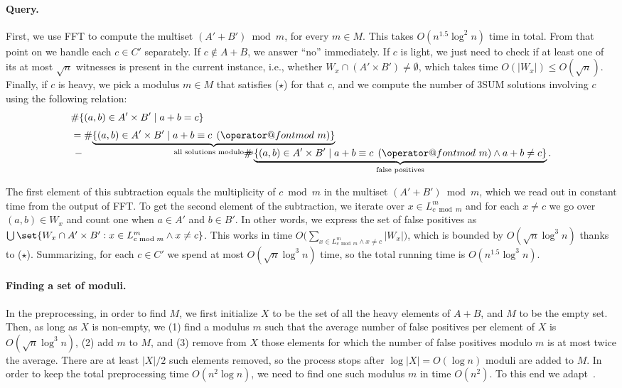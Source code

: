 \documentclass{theoretics}
\makeatletter
\newcommand{\tpmod}[1]{\mkern 8mu({\operator@font mod}\mkern 6mu#1)}
\makeatother
\begin{document}
\paragraph{Query.}
First, we use FFT to compute the multiset $(A'+B') \bmod m$, for every $m \in M$. This takes $O(n^{1.5} \log^2 n)$ time in total. From that point on we handle each $c \in C'$ separately. If $c \notin A+B$, we answer ``no'' immediately. If $c$ is light, we just need to check if at least one of its at most $\sqrt{n}$ witnesses is present in the current instance, i.e., whether $W_x \cap (A' \times B') \neq \emptyset$, which takes time $O(|W_x|) \leqslant O(\sqrt{n})$. Finally, if $c$ is heavy, we pick a modulus $m \in M$ that satisfies ($\star$) for that $c$, and we compute the number of 3SUM solutions involving $c$ using the following relation:
\begin{align*}
& \# \{(a,b) \in A' \times B' \mid a+b=c\} \\[.3em]
& = \# \smash{\underbrace{\{(a,b) \in A' \times B' \mid a + b \equiv c \tpmod{m}\}}_{\text{all solutions modulo $m$}}} \\[.3em]
&\, - \hspace{16em} \# \underbrace{\{(a,b) \in A' \times B' \mid a + b \equiv c \tpmod{m} \land a + b \neq c\}}_{\text{false positives}}.
\end{align*}

The first element of this subtraction equals the multiplicity of $c \bmod m$ in the multiset $(A'+B') \bmod m$, which we read out in constant time from the output of FFT. To get the second element of the subtraction, we iterate over $x \in L^m_{c \bmod m}$ and for each $x \neq c$ we go over $(a,b) \in W_x$ and count one when $a \in A'$ and $b \in B'$. In other words, we express the set of false positives as 
$\bigcup\set{W_x \cap A' \times B' : x \in L^m_{c \bmod m} \land x \neq c}$. This works in time $O\big(\sum_{x \in L^m_{c \bmod m} \land x \neq c} |W_x|\big)$, which is bounded by $O(\sqrt{n} \log^3 n)$ thanks to ($\star$). Summarizing, for each $c \in C'$ we spend at most $O(\sqrt{n} \log^3 n)$ time, so the total running time is $O(n^{1.5} \log^3 n)$.

\paragraph{Finding a set of moduli.}
In the preprocessing, in order to find $M$, we first initialize $X$ to be the set of all the heavy elements of $A+B$, and $M$ to be the empty set. Then, as long as $X$ is non-empty, we (1) find a modulus $m$ such that the average number of false positives per element of $X$ is $O(\sqrt{n} \log^3 n)$, (2) add $m$ to $M$, and (3) remove from $X$ those elements for which the number of false positives modulo $m$ is at most twice the average. There are at least $|X|/2$ such elements removed, so the process stops after $\log |X| = O(\log n)$ moduli are added to $M$. In order to keep the total preprocessing time $O(n^2 \log n)$, we need to find one such modulus $m$ in time $O(n^2)$. To this end we adapt~\cite[Lemma 11]{FischerK024}.
\end{document}
